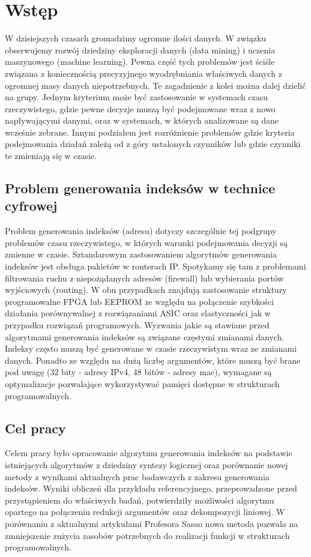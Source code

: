 \chapter{Wstęp}

W dzisiejszych czasach gromadzimy ogromne ilości danych.
W związku obserwujemy rozwój dziedziny eksploracji danych (data mining) i uczenia maszynowego (machine learning).
Pewna część tych problemów jest ściśle związana z koniecznością precyzyjnego wyodrębniania właściwych danych z ogromnej masy danych niepotrzebnych.
Te zagadnienie z kolei można dalej dzielić na grupy.
Jednym kryterium może być zastosowanie w systemach czasu rzeczywistego, gdzie pewne decyzje muszą być podejmowane wraz z nowo napływającymi danymi, oraz w systemach, w których analizowane są dane wcześnie zebrane.
Innym podziałem jest rozróżnienie problemów gdzie kryteria podejmowania działań zależą od z góry ustalonych czynników lub gdzie czynniki te zmieniają się w czasie.

\section{Problem generowania indeksów w technice cyfrowej}

Problem generowania indeksów (adresu) dotyczy szczególnie tej podgrupy problemów czasu rzeczywistego, w których warunki podejmowania decyzji są zmienne w czasie.
Sztandarowym zastosowaniem algorytmów generowania indeksów jest obsługa pakietów w routerach IP.
Spotykamy się tam z problemami filtrowania ruchu z niepożądanych adresów (firewall) lub wybierania portów wyjściowych (routing).
W obu przypadkach znajdują zastosowanie struktury programowalne FPGA lub EEPROM ze względu na połączenie szybkości działania porównywalnej z rozwiązaniami ASIC oraz elastyczności jak w przypadku rozwiązań programowych.
Wyzwania jakie są stawiane przed algorytmami generowania indeksów są związane częstymi zmianami danych.
Indeksy często muszą być generowane w czasie rzeczywistym wraz ze zmianami danych.
Ponadto ze względu na dużą liczbę argumentów, które muszą być brane pod uwagę (32 bity - adresy IPv4, 48 bitów - adresy mac), wymagane są optymalizacje pozwalające wykorzystywać pamięci dostępne w strukturach programowalnych.

\section{Cel pracy}

Celem pracy było opracowanie algorytmu generowania indeksów na podstawie istniejących algorytmów z dziedziny syntezy logicznej oraz porównanie nowej metody z wynikami aktualnych prac badawczych z zakresu generowania indeksów.
Wyniki obliczeń dla przykładu referencyjnego, przeprowadzone przed przystąpieniem do właściwych badań, potwierdziły możliwości algorytmu opartego na połączeniu redukcji argumentów oraz dekompozycji liniowej.
W porównaniu z aktualnymi artykułami Profesora Sasao nowa metoda pozwala na zmniejszenie zużycia zasobów potrzebnych do realizacji funkcji w strukturach programowalnych.
